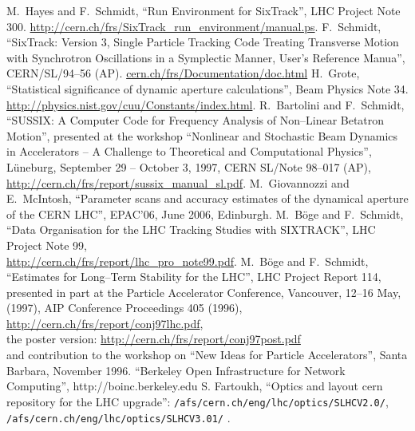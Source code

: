 \documentclass{cernatsnote}
\newcommand{\myhref}[2]{\href{#1}{\color{blue}#2}}
\begin{document}
\begin{thebibliography}{99}
%
 M.~Hayes and F.~Schmidt, ``Run Environment for SixTrack'',
  LHC Project Note 300.
  \myhref{http://cern.ch/frs/SixTrack\_run\_environment/manual.ps}{
  http://cern.ch/frs/SixTrack\_run\_environment/manual.ps}.
%
 F.~Schmidt, ``SixTrack: Version 3, Single Particle
  Tracking Code Treating Transverse Motion with Synchrotron
  Oscillations in a Symplectic Manner, User's Reference Manua'',
  CERN/SL/94--56 (AP).
  \myhref{http://cern.ch/frs/Documentation/doc.html}{
  cern.ch/frs/Documentation/doc.html}
%
 H.~Grote, ``Statistical significance of dynamic
  aperture calculations'', Beam Physics Note 34.
%
 \myhref{http://physics.nist.gov/cuu/Constants/index.html}
  {http://physics.nist.gov/cuu/Constants/index.html}.
%
 R.~Bartolini and F.~Schmidt, ``SUSSIX: A Computer
  Code for Frequency Analysis of Non--Linear Betatron Motion'',
  presented at the workshop ``Nonlinear and Stochastic Beam Dynamics
  in Accelerators -- A Challenge to Theoretical and Computational
  Physics'', L\"uneburg, September 29 -- October 3, 1997, CERN SL/Note
  98--017 (AP),
  \myhref{http://cern.ch/frs/report/sussix_manual_sl.pdf}
  {http://cern.ch/frs/report/sussix\_manual\_sl.pdf}.
%
M.~Giovannozzi and E.~McIntosh, ``Parameter scans and accuracy estimates
of the dynamical aperture of the CERN LHC'', EPAC'06, June 2006, Edinburgh.
%
 M.~B\"oge and F.~Schmidt, ``Data Organisation for
  the LHC Tracking Studies with SIXTRACK'', LHC Project Note 99,\\
  \myhref{http://cern.ch/frs/report/lhc_pro_note99.pdf}
  {http://cern.ch/frs/report/lhc\_pro\_note99.pdf}.
%
 M.~B\"oge and F.~Schmidt, ``Estimates for Long--Term
  Stability for the LHC'', LHC Project Report 114, presented in part
  at the Particle Accelerator Conference, Vancouver, 12--16 May,
  (1997), AIP Conference Proceedings 405 (1996),
  \myhref{http://cern.ch/frs/report/conj97lhc.pdf}
  {http://cern.ch/frs/report/conj97lhc.pdf},\\
  the poster version:
  \myhref{http://cern.ch/frs/report/conj97post.pdf}
  {http://cern.ch/frs/report/conj97post.pdf} \\
  and contribution to the workshop on ``New Ideas for Particle
  Accelerators'', Santa Barbara, November 1996.
%
 ``Berkeley Open Infrastructure for Network Computing'',
   http://boinc.berkeley.edu
  S. Fartoukh, ``Optics and layout cern repository for the LHC
   upgrade'': \texttt{/afs/cern.ch/eng/lhc/optics/SLHCV2.0/},
   \texttt{/afs/cern.ch/eng/lhc/optics/SLHCV3.01/} .

\end{thebibliography}

\clearpage
\end{document}
